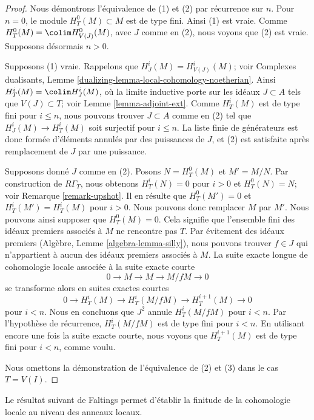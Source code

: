 \begin{proof}
Nous démontrons l'équivalence de (1) et (2) par récurrence sur $n$.
Pour $n = 0$, le module $H^0_T(M) \subset M$ est de type fini. Ainsi (1) est vraie.
Comme $H^0_T(M) = \colim H^0_{V(J)}(M)$, avec $J$ comme en (2), nous voyons
que (2) est vraie. Supposons désormais $n > 0$.

\medskip\noindent
Supposons (1) vraie. Rappelons que $H^i_J(M) = H^i_{V(J)}(M)$; voir
Complexes dualisants, Lemme \ref{dualizing-lemma-local-cohomology-noetherian}.
Ainsi $H^i_T(M) = \colim H^i_J(M)$, où la limite inductive porte sur les idéaux
$J \subset A$ tels que $V(J) \subset T$; voir
Lemme \ref{lemma-adjoint-ext}. Comme $H^i_T(M)$ est de type fini
pour $i \leq n$, nous pouvons trouver $J \subset A$ comme en (2) tel que
$H^i_J(M) \to H^i_T(M)$ soit surjectif pour $i \leq n$.
La liste finie de générateurs est donc formée d'éléments annulés par des puissances de $J$,
et (2) est satisfaite après remplacement de $J$ par une puissance.

\medskip\noindent
Supposons donné $J$ comme en (2). Posons $N = H^0_T(M)$ et $M' = M/N$.
Par construction de $R\Gamma_T$, nous obtenons
$H^i_T(N) = 0$ pour $i > 0$ et $H^0_T(N) = N$; voir
Remarque \ref{remark-upshot}. Il en résulte que
$H^0_T(M') = 0$ et $H^i_T(M') = H^i_T(M)$ pour $i > 0$.
Nous pouvons donc remplacer $M$ par $M'$.
Nous pouvons ainsi supposer que $H^0_T(M) = 0$.
Cela signifie que l'ensemble fini des idéaux premiers associés à $M$
ne rencontre pas $T$. Par évitement des idéaux premiers (Algèbre, Lemme \ref{algebra-lemma-silly}),
nous pouvons trouver $f \in J$ qui n'appartient à aucun des idéaux premiers associés à $M$.
La suite exacte longue de cohomologie locale associée à la suite
exacte courte
$$
0 \to M \to M \to M/fM \to 0
$$
se transforme alors en suites exactes courtes
$$
0 \to H^i_T(M) \to H^i_T(M/fM) \to H^{i + 1}_T(M) \to 0
$$
pour $i < n$. Nous en concluons que $J^2$ annule $H^i_T(M/fM)$
pour $i < n$. Par l'hypothèse de récurrence, $H^i_T(M/fM)$
est de type fini pour $i < n$. En utilisant encore une fois la suite exacte courte,
nous voyons que $H^{i + 1}_T(M)$ est de type fini pour $i < n$, comme voulu.

\medskip\noindent
Nous omettons la démonstration de l'équivalence de (2) et (3)
dans le cas $T = V(I)$.
\end{proof}

\noindent
Le résultat suivant de Faltings permet d'établir la finitude
de la cohomologie locale au niveau des anneaux locaux.

